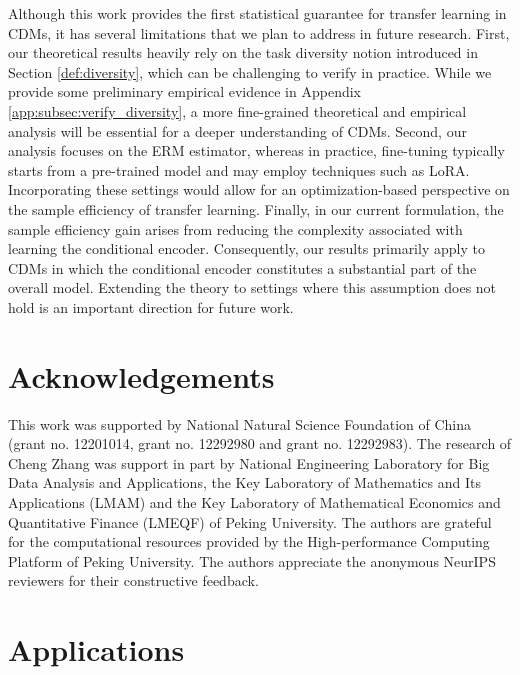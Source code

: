 \documentclass{article}
\numberwithin{equation}{section}
\theoremstyle{definition}
\begin{document}
Although this work provides the first statistical guarantee for transfer learning in CDMs, it has several limitations that we plan to address in future research. First, our theoretical results heavily rely on the task diversity notion introduced in Section \ref{def:diversity}, which can be challenging to verify in practice. While we provide some preliminary empirical evidence in Appendix \ref{app:subsec:verify_diversity}, a more fine-grained theoretical and empirical analysis will be essential for a deeper understanding of CDMs. Second, our analysis focuses on the ERM estimator, whereas in practice, fine-tuning typically starts from a pre-trained model and may employ techniques such as LoRA. Incorporating these settings would allow for an optimization-based perspective on the sample efficiency of transfer learning. Finally, in our current formulation, the sample efficiency gain arises from reducing the complexity associated with learning the conditional encoder. Consequently, our results primarily apply to CDMs in which the conditional encoder constitutes a substantial part of the overall model. Extending the theory to settings where this assumption does not hold is an important direction for future work.

\section*{Acknowledgements}
This work was supported by National Natural Science Foundation of China (grant no. 12201014, grant no. 12292980
and grant no. 12292983). The research of Cheng Zhang
was support in part by National Engineering Laboratory for
Big Data Analysis and Applications, the Key Laboratory
of Mathematics and Its Applications (LMAM) and the Key
Laboratory of Mathematical Economics and Quantitative
Finance (LMEQF) of Peking University.
The authors are grateful for the computational resources provided by the High-performance Computing Platform of Peking University.
The authors appreciate the anonymous NeurIPS
reviewers for their constructive feedback.






\newpage

\appendix

\section{Applications}\label{sec:application}
\end{document}
